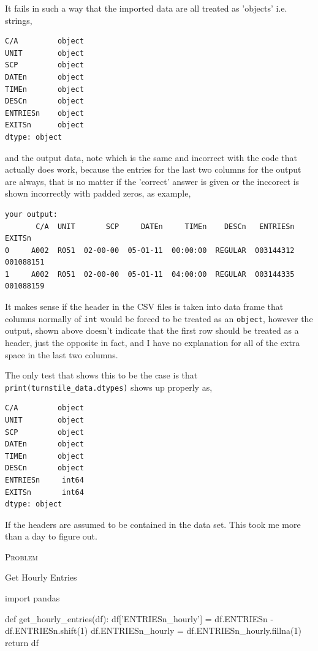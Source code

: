 \documentclass{article}
\numberwithin{questionCtr}{section}
\newcounter{problemCtr}
\newenvironment{problem}{%
   \bigskip\noindent%
   \refstepcounter{problemCtr}%
   \textsc{Problem \theproblemCtr}%
   \newline%
   }{\par\bigskip}  %
\numberwithin{problemCtr}{section}
\begin{document}
It fails in such a way that the imported data are all treated as 'objects' i.e. strings,

\begin{verbatim}
C/A         object
UNIT        object
SCP         object
DATEn       object
TIMEn       object
DESCn       object
ENTRIESn    object
EXITSn      object
dtype: object
\end{verbatim}
and the output data, note which is the same and incorrect with the code that
actually does work, because the entries for the last two columns for the output
are always, that is no matter if the 'correct' answer is given or the inccorect
is shown incorrectly with padded zeros, as example,

{\footnotesize
\begin{verbatim}
your output:
       C/A  UNIT       SCP     DATEn     TIMEn    DESCn   ENTRIESn                     EXITSn
0     A002  R051  02-00-00  05-01-11  00:00:00  REGULAR  003144312                 001088151
1     A002  R051  02-00-00  05-01-11  04:00:00  REGULAR  003144335               001088159      
\end{verbatim}}
It makes sense if the header in the CSV files is taken into data frame that
columns normally of \verb|int| would be forced to be treated as an
\verb|object|, however the output, shown above doesn't indicate that the first
row should be treated as a header, just the opposite in fact, and I have no
explanation for all of the extra space in the last two columns.

The only test that shows this to be the case is that
\verb|print(turnstile_data.dtypes)| shows up properly as,

\begin{verbatim}
C/A         object
UNIT        object
SCP         object
DATEn       object
TIMEn       object
DESCn       object
ENTRIESn     int64
EXITSn       int64
dtype: object
\end{verbatim}

If the headers are assumed to be contained in the data set.  This took me more
than a day to figure out.

\begin{problem}
Get Hourly Entries 
\end{problem}

\begin{python1}
import pandas

def get_hourly_entries(df):
    df['ENTRIESn_hourly'] = df.ENTRIESn - df.ENTRIESn.shift(1)
    df.ENTRIESn_hourly = df.ENTRIESn_hourly.fillna(1)
    return df
\end{python1}
\end{document}
